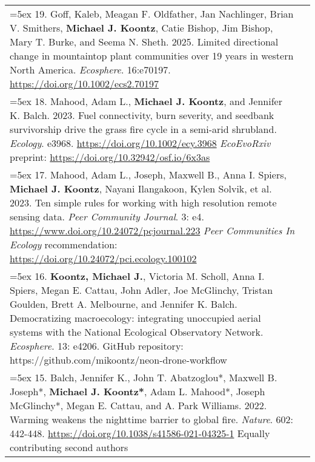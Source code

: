 \begin{longtable}{@{}>{\raggedright}p{6.10in} >{\raggedleft}X @{}}

\hangindent=5ex 19. Goff, Kaleb, Meagan F. Oldfather, Jan Nachlinger, Brian V. Smithers, \textbf{Michael J. Koontz}, Catie Bishop, Jim Bishop, Mary T. Burke, and Seema N. Sheth. 2025. Limited directional change in mountaintop plant communities over 19 years in western North America. \emph{Ecosphere}. 16:e70197. \href{https://doi.org/10.1002/ecs2.70197}{https://doi.org/10.1002/ecs2.70197} & \tabularnewline

\hangindent=5ex 18. Mahood, Adam L., \textbf{Michael J. Koontz}, and Jennifer K. Balch. 2023. Fuel connectivity, burn severity, and seedbank survivorship drive the grass fire cycle in a semi-arid shrubland. \emph{Ecology}. e3968. \href{https://doi.org/10.1002/ecy.3968}{https://doi.org/10.1002/ecy.3968}
\newline \emph{EcoEvoRxiv} preprint: \href{https://doi.org/10.32942/osf.io/6x3as}{https://doi.org/10.32942/osf.io/6x3as} & \tabularnewline

\hangindent=5ex 17. Mahood, Adam L., Joseph, Maxwell B., Anna I. Spiers, \textbf{Michael J. Koontz}, Nayani Ilangakoon, Kylen Solvik, et al. 2023. Ten simple rules for working with high resolution remote sensing data. \emph{Peer Community Journal}. 3: e4. \href{https://www.doi.org/10.24072/pcjournal.223}{https://www.doi.org/10.24072/pcjournal.223}
\newline \emph{Peer Communities In Ecology} recommendation: \href{https://doi.org/10.24072/pci.ecology.100102}{https://doi.org/10.24072/pci.ecology.100102} & \tabularnewline

\hangindent=5ex 16. \textbf{Koontz, Michael J.}, Victoria M. Scholl, Anna I. Spiers, Megan E. Cattau, John Adler, Joe McGlinchy, Tristan Goulden, Brett A. Melbourne, and Jennifer K. Balch. Democratizing macroecology: integrating unoccupied aerial systems with the National Ecological Observatory Network. \emph{Ecosphere}. 13: e4206.
\newline GitHub repository: https://github.com/mikoontz/neon-drone-workflow & \tabularnewline

\hangindent=5ex 15. Balch, Jennifer K., John T. Abatzoglou*, Maxwell B. Joseph*, \textbf{Michael J. Koontz*}, Adam L. Mahood*, Joseph McGlinchy*, Megan E. Cattau, and A. Park Williams. 2022. Warming weakens the nighttime barrier to global fire. \emph{Nature}. 602: 442-448. \href{https://doi.org/10.1038/s41586-021-04325-1}{https://doi.org/10.1038/s41586-021-04325-1}
\newline *Equally contributing second authors & \tabularnewline


\end{longtable}
